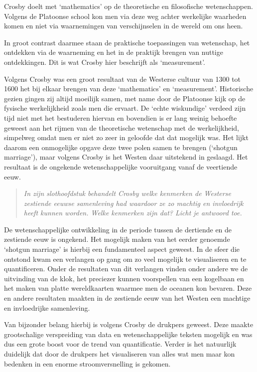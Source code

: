 \documentclass[a4paper,11pt]{article}
\begin{document}
Crosby doelt met `mathematics' op de theoretische en filosofische
wetenschappen. Volgens de Platoonse school kon men via deze weg achter
werkelijke waarheden komen en niet via waarnemingen van verschijnselen in de
wereld om ons heen.

In groot contrast daarmee staan de praktische toepassingen van wetenschap, het
ontdekken via de waarneming en het in de praktijk brengen van nuttige
ontdekkingen. Dit is wat Crosby hier beschrijft als `measurement'.

Volgens Crosby was een groot resultaat van de Westerse cultuur van 1300 tot
1600 het bij elkaar brengen van deze `mathematics' en
`measurement'. Historische gezien gingen zij altijd moeilijk samen, met name
door de Platoonse kijk op de fysische werkelijkheid zoals men die ervaart. De
`echte wiskundige' verdeed zijn tijd niet met het bestuderen hiervan en
bovendien is er lang weinig behoefte geweest aan het rijmen van de
theoretische wetenschap met de werkelijkheid, simpelweg omdat men er niet zo
zeer in geloofde dat dat mogelijk was. Het lijkt daarom een onmogelijke opgave
deze twee polen samen te brengen (`shotgun marriage'), maar volgens Crosby is
het Westen daar uitstekend in geslaagd. Het resultaat is de ongekende
wetenschappelijke vooruitgang vanaf de veertiende eeuw.


\begin{quote}
\emph{In zijn slothoofdstuk behandelt Crosby welke kenmerken de Westerse
  zestiende eeuwse samenleving had waardoor ze zo machtig en invloedrijk heeft
  kunnen worden. Welke kenmerken zijn dat? Licht je antwoord toe.}
\end{quote}


De wetenschappelijke ontwikkeling in de periode tussen de dertiende en de
zestiende eeuw is ongekend. Het mogelijk maken van het eerder genoemde
`shotgun marriage' is hierbij een fundamenteel aspect geweest. In de sfeer die
ontstond kwam een verlangen op gang om zo veel mogelijk te visualiseren en te
quantificeren. Onder de resultaten van dit verlangen vinden onder andere we de
uitvinding van de klok, het preciezer kunnen voorspellen van een kogelbaan en
het maken van platte wereldkaarten waarmee men de oceanen kon bevaren. Deze en
andere resultaten maakten in de zestiende eeuw van het Westen een machtige en
invloedrijke samenleving.

Van bijzonder belang hierbij is volgens Crosby de drukpers geweest. Deze
maakte grootschalige verspreiding van data en wetenschappelijke teksten
mogelijk en was dus een grote boost voor de trend van quantificatie. Verder is
het natuurlijk duidelijk dat door de drukpers het visualiseren van alles wat
men maar kon bedenken in een enorme stroomversnelling is gekomen.
\end{document}
